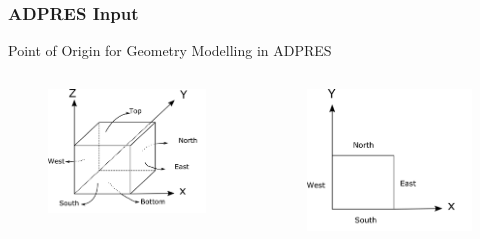 \documentclass{beamer}
\begin{document}

\begin{frame}[fragile] %
\frametitle{ADPRES Input}
Point of Origin for Geometry Modelling in ADPRES
\begin{columns}[c] %

\begin{figure}
\includegraphics[width=1.0\linewidth]{geom_1.png}
\end{figure}

\begin{figure}
\includegraphics[width=1.0\linewidth]{geom_2.png}
\end{figure}

\end{columns}
\end{frame}
\end{document}
